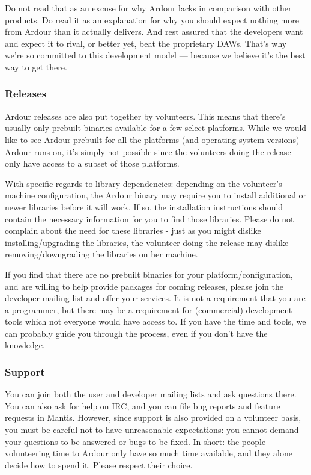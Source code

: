 \documentclass[10pt,a4paper]{book}
\begin{document}
Do not read that as an excuse for why Ardour lacks in comparison with
other products. Do read it as an explanation for why you should expect
nothing more from Ardour than it actually delivers. And rest assured
that the developers want and expect it to rival, or better yet, beat
the proprietary DAWs. That's why we're so committed to this
development model --- because we believe it's the best way to get there.

\subsubsection{Releases}

Ardour releases are also put together by volunteers. This means that
there's usually only prebuilt binaries available for a few select
platforms. While we would like to see Ardour prebuilt for all the
platforms (and operating system versions) Ardour runs on, it's simply
not possible since the volunteers doing the release only have access
to a subset of those platforms.

With specific regards to library dependencies: depending on the
volunteer's machine configuration, the Ardour binary may require you
to install additional or newer libraries before it will work. If so,
the installation instructions should contain the necessary information
for you to find those libraries. Please do not complain about the need
for these libraries - just as you might dislike installing/upgrading
the libraries, the volunteer doing the release may dislike
removing/downgrading the libraries on her machine.

If you find that there are no prebuilt binaries for your
platform/configuration, and are willing to help provide packages for
coming releases, please join the developer mailing list and offer your
services. It is not a requirement that you are a programmer, but there
may be a requirement for (commercial) development tools which not
everyone would have access to. If you have the time and tools, we can
probably guide you through the process, even if you don't have the
knowledge.

\subsubsection{Support}

You can join both the user and developer mailing lists and ask
questions there. You can also ask for help on IRC, and you can file
bug reports and feature requests in Mantis. However, since support is
also provided on a volunteer basis, you must be careful not to have
unreasonable expectations: you cannot demand your questions to be
answered or bugs to be fixed. In short: the people volunteering time
to Ardour only have so much time available, and they alone decide how
to spend it. Please respect their choice.
\end{document}
